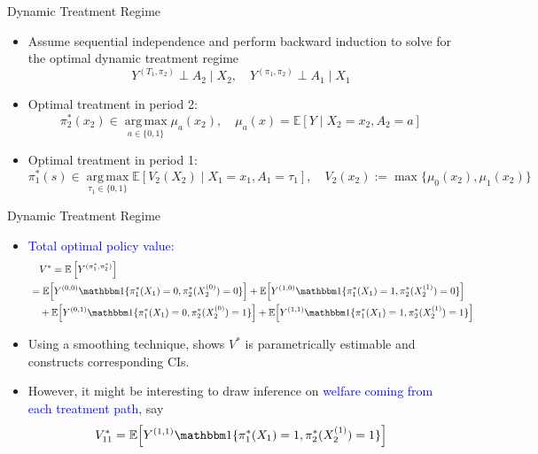 \documentclass[aspectratio=169,xcolor=dvipsnames]{beamer}
\begin{document}
\begin{frame}{Dynamic Treatment Regime}
    \begin{itemize}
        \item Assume sequential independence and perform backward induction to solve for the optimal dynamic treatment regime
            \[
            Y^{(T_1, \pi_2 )} \perp A_2 \mid X_2, \quad Y^{(\pi_1, \pi_2)} \perp A_1 \mid X_1
            \]

        \item Optimal treatment in period 2:
            \[
                \pi_2^*(x_2) \in \operatorname*{arg\,max}_{a\in\{0,1\}} \mu_{a}(x_2), \quad \mu_a(x) = \mathbb{E}[Y\mid X_2 = x_2, A_2 = a]
            \]
        \item Optimal treatment in period 1:
            \[
                \pi_1^*(s) \in \operatorname*{arg\,max}_{\tau_1\in\{0,1\}} \mathbb E[V_2(X_2)\mid X_1=x_1,A_1=\tau_1], \quad V_2(x_2) := \max\{\mu_0(x_2),\mu_1(x_2)\}
            \]
    \end{itemize}
\end{frame}

\begin{frame}{Dynamic Treatment Regime}
    \begin{itemize}
        \item \textcolor{blue}{Total optimal policy value:}
            \begin{align*}
                &\quad V^*
                = \mathbb{E}\left[Y^{(\pi^*_1, \pi^*_2)}\right]\\
                &= \mathbb E\!\left[
                Y^{(0,0)}
                \mathbbm 1\{\pi_1^*(X_1)=0,\pi_2^*(X^{(0)}_2)=0\}
                \right]+
                \mathbb E\!\left[
                Y^{(1,0)}
                \mathbbm 1\{\pi_1^*(X_1)=1,\pi_2^*(X^{(1)}_2)=0\}
                \right] \\
                &\quad+
                \mathbb E\!\left[
                Y^{(0,1)}
                \mathbbm 1\{\pi_1^*(X_1)=0,\pi_2^*(X^{(0)}_2)=1\}
                \right] +
                \mathbb E\!\left[
                Y^{(1,1)}
                \mathbbm 1\{\pi_1^*(X_1)=1,\pi_2^*(X^{(1)}_2)=1\}
                \right]
            \end{align*}

        \item Using a smoothing technique, \citet*{whitehouse2026inference} shows $V^*$ is parametrically estimable and constructs corresponding CIs.

        \item However, it might be interesting to draw inference on \textcolor{blue}{welfare coming from each treatment path}, say
            \[
            V^*_{11} = \mathbb E\!\left[
                Y^{(1,1)}
                \mathbbm 1\{\pi_1^*(X_1)=1,\pi_2^*(X^{(1)}_2)=1\}
                \right]
            \]

    \end{itemize}
\end{frame}
\end{document}
